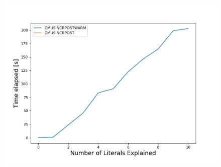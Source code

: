 \begin{figure}[]
    \centering
    \includegraphics[width=\textwidth]{figures/omusNonConstrCumulative.png}
    \caption{}
    \label{}
\end{figure}